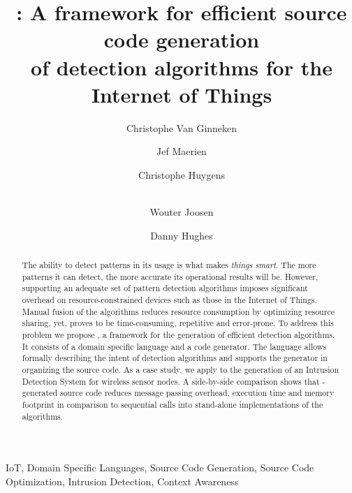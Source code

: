 \documentclass[3p,times,procedia]{elsarticle}
\begin{document}
\begin{frontmatter}


\title{
\FOO: A framework for efficient source code generation\\
of detection algorithms for the Internet of Things
}

\author[]{Christophe Van Ginneken}
\author[]{Jef Maerien}
\author[]{Christophe Huygens}
\author[]{\\Wouter Joosen}
\author[]{Danny Hughes}

\address{
iMinds-DistriNet, KU Leuven, 3001 Leuven, Belgium\\
\{firstname.lastname\}@cs.kuleuven.be
}

\begin{abstract}

The ability to detect patterns in its usage is what makes \emph{things}
\emph{smart}. The more patterns it can detect, the more accurate its
operational results will be. However, supporting an adequate set of pattern
detection algorithms imposes significant overhead on resource-constrained
devices such as those in the Internet of Things. Manual fusion of the
algorithms reduces resource consumption by optimizing resource sharing, yet,
proves to be time-consuming, repetitive and error-prone. To address this
problem we propose \FOO, a framework for the generation of efficient detection
algorithms. It consists of a domain specific language and a code generator. The
language allows formally describing the intent of detection algorithms and
supports the generator in organizing the source code. As a case study, we apply
\FOO to the generation of an Intrusion Detection System for wireless sensor
nodes. A side-by-side comparison shows that \FOO-generated source code reduces
message passing overhead, execution time and memory footprint in comparison to
sequential calls into stand-alone implementations of the algorithms.

\end{abstract}

\begin{keyword}

IoT, Domain Specific Languages, Source Code Generation, Source Code
Optimization, Intrusion Detection, Context Awareness

\end{keyword}

\end{frontmatter}
\end{document}
